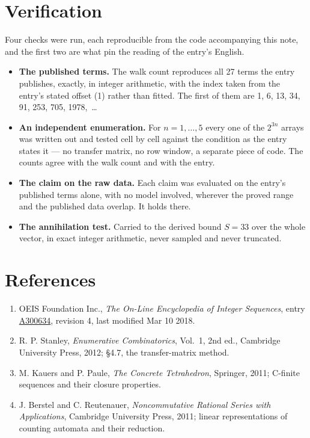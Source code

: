 \documentclass[11pt]{article}
\theoremstyle{definition}
\begin{document}
\section{Verification}

Four checks were run, each reproducible from the code accompanying this note, and the first two are what pin the reading of the entry's English.

\begin{itemize}

\item {\bfseries The published terms.} The walk count reproduces all 27 terms the entry publishes, exactly, in integer arithmetic, with the index taken from the entry's stated offset (1) rather than fitted. The first of them are 1, 6, 13, 34, 91, 253, 705, 1978,~\dots

\item {\bfseries An independent enumeration.} For $n = 1,\dots,5$ every one of the $2^{3n}$ arrays was written out and tested cell by cell against the condition as the entry states it --- no transfer matrix, no row window, a separate piece of code. The counts agree with the walk count and with the entry.

\item {\bfseries The claim on the raw data.} Each claim was evaluated on the entry's published terms alone, with no model involved, wherever the proved range and the published data overlap. It holds there.

\item {\bfseries The annihilation test.} Carried to the derived bound $S = 33$ over the whole vector, in exact integer arithmetic, never sampled and never truncated.

\end{itemize}

\section{References}

\begin{enumerate}

\item OEIS Foundation Inc., \emph{The On-Line Encyclopedia of Integer Sequences}, entry \href{https://oeis.org/A300634}{A300634}, revision 4, last modified Mar 10 2018.

\item R. P. Stanley, \emph{Enumerative Combinatorics}, Vol.~1, 2nd ed., Cambridge University Press, 2012; \S4.7, the transfer-matrix method.

\item M. Kauers and P. Paule, \emph{The Concrete Tetrahedron}, Springer, 2011; C-finite sequences and their closure properties.

\item J. Berstel and C. Reutenauer, \emph{Noncommutative Rational Series with Applications}, Cambridge University Press, 2011; linear representations of counting automata and their reduction.

\end{enumerate}
\end{document}

